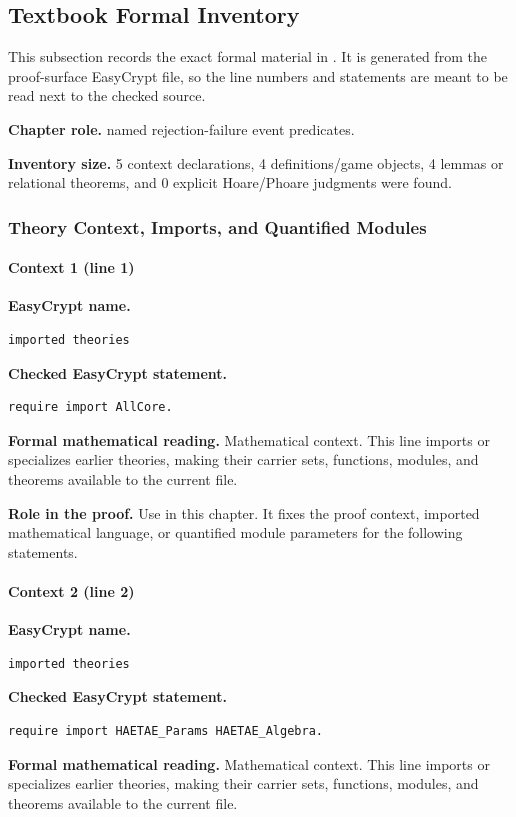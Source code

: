 \subsection*{Textbook Formal Inventory}
This subsection records the exact formal material in .  It is generated from the proof-surface EasyCrypt file, so the line numbers and statements are meant to be read next to the checked source.

\noindent\textbf{Chapter role.} named rejection-failure event predicates.

\noindent\textbf{Inventory size.} 5 context declarations, 4 definitions/game objects, 4 lemmas or relational theorems, and 0 explicit Hoare/Phoare judgments were found.

\subsubsection*{Theory Context, Imports, and Quantified Modules}
\paragraph{Context 1 (line 1)}
\noindent\textbf{EasyCrypt name.}
\begin{lstlisting}[language=EasyCrypt,basicstyle=\ttfamily\scriptsize]
imported theories
\end{lstlisting}
\noindent\textbf{Checked EasyCrypt statement.}
\begin{lstlisting}[language=EasyCrypt,basicstyle=\ttfamily\scriptsize]
require import AllCore.
\end{lstlisting}
\noindent\textbf{Formal mathematical reading.}
Mathematical context. This line imports or specializes earlier theories, making their carrier sets, functions, modules, and theorems available to the current file.

\noindent\textbf{Role in the proof.}
Use in this chapter. It fixes the proof context, imported mathematical language, or quantified module parameters for the following statements.

\paragraph{Context 2 (line 2)}
\noindent\textbf{EasyCrypt name.}
\begin{lstlisting}[language=EasyCrypt,basicstyle=\ttfamily\scriptsize]
imported theories
\end{lstlisting}
\noindent\textbf{Checked EasyCrypt statement.}
\begin{lstlisting}[language=EasyCrypt,basicstyle=\ttfamily\scriptsize]
require import HAETAE_Params HAETAE_Algebra.
\end{lstlisting}
\noindent\textbf{Formal mathematical reading.}
Mathematical context. This line imports or specializes earlier theories, making their carrier sets, functions, modules, and theorems available to the current file.

